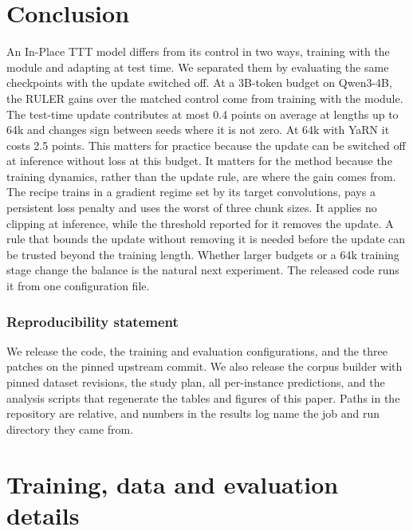 \documentclass{article}
\begin{document}
\section{Conclusion}

An In-Place TTT model differs from its control in two ways, training with the module and adapting at test time. We separated them by evaluating the same checkpoints with the update switched off. At a 3B-token budget on Qwen3-4B, the RULER gains over the matched control come from training with the module. The test-time update contributes at most 0.4 points on average at lengths up to 64k and changes sign between seeds where it is not zero. At 64k with YaRN it costs 2.5 points. This matters for practice because the update can be switched off at inference without loss at this budget. It matters for the method because the training dynamics, rather than the update rule, are where the gain comes from. The recipe trains in a gradient regime set by its target convolutions, pays a persistent loss penalty and uses the worst of three chunk sizes. It applies no clipping at inference, while the threshold reported for it removes the update. A rule that bounds the update without removing it is needed before the update can be trusted beyond the training length. Whether larger budgets or a 64k training stage change the balance is the natural next experiment. The released code runs it from one configuration file.

\subsubsection*{Reproducibility statement}

We release the code, the training and evaluation configurations, and the three patches on the pinned upstream commit. We also release the corpus builder with pinned dataset revisions, the study plan, all per-instance predictions, and the analysis scripts that regenerate the tables and figures of this paper. Paths in the repository are relative, and numbers in the results log name the job and run directory they came from.




\clearpage
\appendix

\section{Training, data and evaluation details}\label{app:setup}
\end{document}
